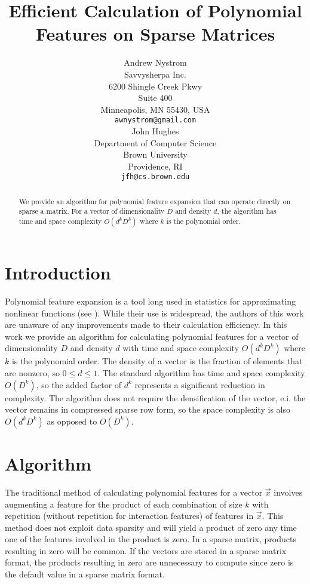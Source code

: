 \documentclass{article} %
\title{Efficient Calculation of Polynomial Features on Sparse Matrices}
\author{Andrew Nystrom \\
Savvysherpa Inc.\\
6200 Shingle Creek Pkwy \\
Suite 400 \\
Minneapolis, MN 55430, USA \\
\texttt{awnystrom@gmail.com} \\
\And
John Hughes \\
Department of Computer Science \\
Brown University \\
Providence, RI \\
\texttt{jfh@cs.brown.edu} \\
}
\begin{document}
\maketitle

\begin{abstract}
We provide an algorithm for polynomial feature expansion that can operate directly on sparse a matrix.
For a vector of dimensionality $D$ and density $d$, the algorithm has time and space complexity $O(d^kD^k)$ where $k$ is the polynomial order.
\end{abstract}

\section{Introduction}

Polynomial feature expansion is a tool long used in statistics for approximating nonlinear functions (see \cite{gergonne1974application, smith1918standard}).
While their use is widespread, the authors of this work are unaware of any improvements made to their calculation efficiency.
In this work we provide an algorithm for calculating polynomial features for a vector of dimensionality $D$ and density $d$ with time and space complexity $O(d^kD^k)$ where $k$ is the polynomial order.
The density of a vector is the fraction of elements that are nonzero, so $0 \le d \le 1$.
The standard algorithm has time and space complexity $O(D^k)$, so the added factor of $d^k$ represents a significant reduction in complexity.
The algorithm does not require the densification of the vector, e.i. the vector remains in compressed sparse row form, so the space complexity is also $O(d^kD^k)$ as opposed to $O(D^k)$.

\section{Algorithm}
The traditional method of calculating polynomial features for a vector $\vec{x}$ involves augmenting a feature for the product of each combination of size $k$ with repetition (without repetition for interaction features) of features in $\vec{x}$.
This method does not exploit data sparsity and will yield a product of zero any time one of the features involved in the product is zero.
In a sparse matrix, products resulting in zero will be common.
If the vectors are stored in a sparse matrix format, the products resulting in zero are unnecessary to compute since zero is the default value in a sparse matrix format.
\end{document}
